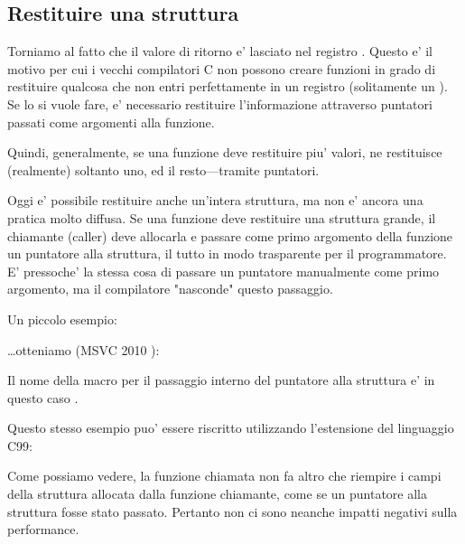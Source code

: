 \subsection{Restituire una struttura}


Torniamo al fatto che il valore di ritorno e' lasciato nel registro \EAX.
Questo e' il motivo per cui i vecchi compilatori C non possono creare funzioni in grado di restituire qualcosa che non entri perfettamente in un 
registro (solitamente un \Tint). Se lo si vuole fare, e' necessario restituire l'informazione attraverso puntatori passati come argomenti alla funzione.

Quindi, generalmente, se una funzione deve restituire piu' valori, ne restituisce (realmente) soltanto uno, ed il resto---tramite puntatori.

Oggi e' possibile restituire anche un'intera struttura, ma non e' ancora una pratica molto diffusa.
Se una funzione deve restituire una struttura grande, il chiamante (\gls{caller}) deve allocarla e passare come primo argomento della funzione un puntatore alla struttura, il tutto in modo trasparente per il programmatore.
E' pressoche' la stessa cosa di passare un puntatore manualmente come primo argomento, ma il compilatore "nasconde" questo passaggio.

Un piccolo esempio:



\dots otteniamo (MSVC 2010 \Ox):



Il nome della macro per il passaggio interno del puntatore alla struttura e' in questo caso .

Questo stesso esempio puo' essere riscritto utilizzando l'estensione del linguaggio C99:





Come possiamo vedere, la funzione chiamata non fa altro che riempire i campi della struttura allocata dalla funzione chiamante,
come se un puntatore alla struttura fosse stato passato.
Pertanto non ci sono neanche impatti negativi sulla performance.
